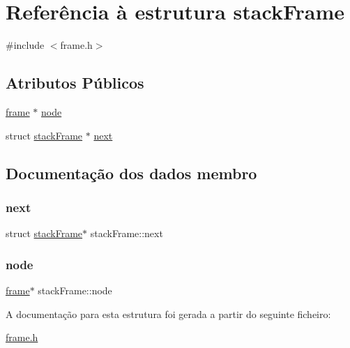 \hypertarget{structstack_frame}{}\section{Referência à estrutura stack\+Frame}
\label{structstack_frame}


{\ttfamily \#include $<$frame.\+h$>$}

\subsection*{Atributos Públicos}
\begin{DoxyCompactItemize}
\item 
\hyperlink{structframe}{frame} $\ast$ \hyperlink{structstack_frame_aa0ce547961200c5d22565f2d6024b7f9}{node}
\item 
struct \hyperlink{structstack_frame}{stack\+Frame} $\ast$ \hyperlink{structstack_frame_ae23c22c5fd9960b731bc85ed04c0580d}{next}
\end{DoxyCompactItemize}


\subsection{Documentação dos dados membro}
\hypertarget{structstack_frame_ae23c22c5fd9960b731bc85ed04c0580d}{}\label{structstack_frame_ae23c22c5fd9960b731bc85ed04c0580d} 
\subsubsection{\texorpdfstring{next}{next}}
{\footnotesize\ttfamily struct \hyperlink{structstack_frame}{stack\+Frame}$\ast$ stack\+Frame\+::next}

\hypertarget{structstack_frame_aa0ce547961200c5d22565f2d6024b7f9}{}\label{structstack_frame_aa0ce547961200c5d22565f2d6024b7f9} 
\subsubsection{\texorpdfstring{node}{node}}
{\footnotesize\ttfamily \hyperlink{structframe}{frame}$\ast$ stack\+Frame\+::node}



A documentação para esta estrutura foi gerada a partir do seguinte ficheiro\+:\begin{DoxyCompactItemize}
\item 
\hyperlink{frame_8h}{frame.\+h}\end{DoxyCompactItemize}
